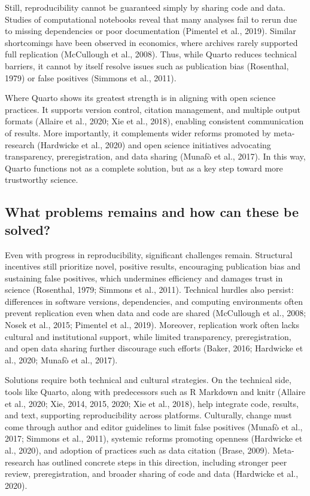 \documentclass[
  a4paper,
]{article}
\begin{document}
Still, reproducibility cannot be guaranteed simply by sharing code and
data. Studies of computational notebooks reveal that many analyses fail
to rerun due to missing dependencies or poor documentation (Pimentel et
al., 2019). Similar shortcomings have been observed in economics, where
archives rarely supported full replication (McCullough et al., 2008).
Thus, while Quarto reduces technical barriers, it cannot by itself
resolve issues such as publication bias (Rosenthal, 1979) or false
positives (Simmons et al., 2011).

Where Quarto shows its greatest strength is in aligning with open
science practices. It supports version control, citation management, and
multiple output formats (Allaire et al., 2020; Xie et al., 2018),
enabling consistent communication of results. More importantly, it
complements wider reforms promoted by meta-research (Hardwicke et al.,
2020) and open science initiatives advocating transparency,
preregistration, and data sharing (Munafò et al., 2017). In this way,
Quarto functions not as a complete solution, but as a key step toward
more trustworthy science.

\subsection{What problems remains and how can these be
solved?}\label{what-problems-remains-and-how-can-these-be-solved}

Even with progress in reproducibility, significant challenges remain.
Structural incentives still prioritize novel, positive results,
encouraging publication bias and sustaining false positives, which
undermines efficiency and damages trust in science (Rosenthal, 1979;
Simmons et al., 2011). Technical hurdles also persist: differences in
software versions, dependencies, and computing environments often
prevent replication even when data and code are shared (McCullough et
al., 2008; Nosek et al., 2015; Pimentel et al., 2019). Moreover,
replication work often lacks cultural and institutional support, while
limited transparency, preregistration, and open data sharing further
discourage such efforts (Baker, 2016; Hardwicke et al., 2020; Munafò et
al., 2017).

Solutions require both technical and cultural strategies. On the
technical side, tools like Quarto, along with predecessors such as R
Markdown and knitr (Allaire et al., 2020; Xie, 2014, 2015, 2020; Xie et
al., 2018), help integrate code, results, and text, supporting
reproducibility across platforms. Culturally, change must come through
author and editor guidelines to limit false positives (Munafò et al.,
2017; Simmons et al., 2011), systemic reforms promoting openness
(Hardwicke et al., 2020), and adoption of practices such as data
citation (Brase, 2009). Meta-research has outlined concrete steps in
this direction, including stronger peer review, preregistration, and
broader sharing of code and data (Hardwicke et al., 2020).
\end{document}
